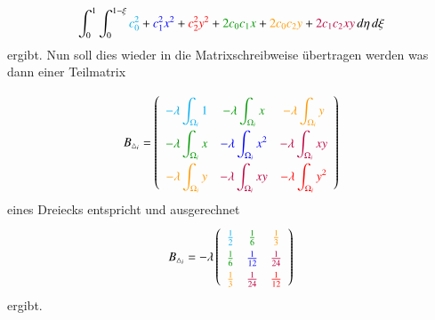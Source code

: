 \begin{equation}
			\int_0^1 \int_0^{1 - \xi}  \textcolor{cyan}{c_0^2} + \textcolor{blue}{c_1^2 x^2} + \textcolor{red}{c_2^2 y^2} + \textcolor{darkgreen}{2 c_0 c_1 x} + \textcolor{orange}{2 c_0 c_2 y} +\textcolor{purple}{ 2 c_1 c_2 xy} \,  d\eta \, d \xi
			\label{fem:Minimal2LinAlgB}
\end{equation}
ergibt.
Nun soll dies wieder in die Matrixschreibweise übertragen werden was dann einer Teilmatrix

\begin{equation}
\renewcommand\arraystretch{2}
B_{\triangle_i}
=
\left( \begin{array}{ccc}
\displaystyle\color{cyan}{- \lambda \int_{\Omega_i} 1}
	&  \displaystyle\color{darkgreen}{- \lambda \int_{\Omega_i} x}
		& \displaystyle\color{orange}{- \lambda \int_{\Omega_i} y}
\\
\displaystyle\color{darkgreen}{- \lambda \int_{\Omega_i}x}
	& \displaystyle\color{blue}{- \lambda \int_{\Omega_i} x^2}
		&  \displaystyle\color{purple}{- \lambda \int_{\Omega_i} xy}
\\
\displaystyle\color{orange}{- \lambda \int_{\Omega_i} y}
	& \displaystyle\color{purple}{- \lambda \int_{\Omega_i} xy}
		& \displaystyle\color{red}{ - \lambda \int_{\Omega_i} y^2} \\
\end{array}\right)
\label{fem:MatrixB}
\end{equation}
eines Dreiecks entspricht und ausgerechnet
\begin{equation}
\renewcommand\arraystretch{1.4}
 B_{\triangle_i} = - \lambda \left( \begin{array}{ccc}
	\textcolor{cyan}{ \frac{1}{2}} &  \textcolor{darkgreen}{ \frac{1}{6}}& \textcolor{orange}{\frac{1}{3}}  \\
	\textcolor{darkgreen}{\frac{1}{6}} & \textcolor{blue}{\frac{1}{12}} &  \textcolor{purple}{ \frac{1}{24}} \\
	\textcolor{orange}{\frac{1}{3}} & \textcolor{purple}{\frac{1}{24}} & \textcolor{red}{ \frac{1}{12}} \\
	\end{array}\right) 
	\label{fem:MatrixB}
\end{equation}
ergibt.

